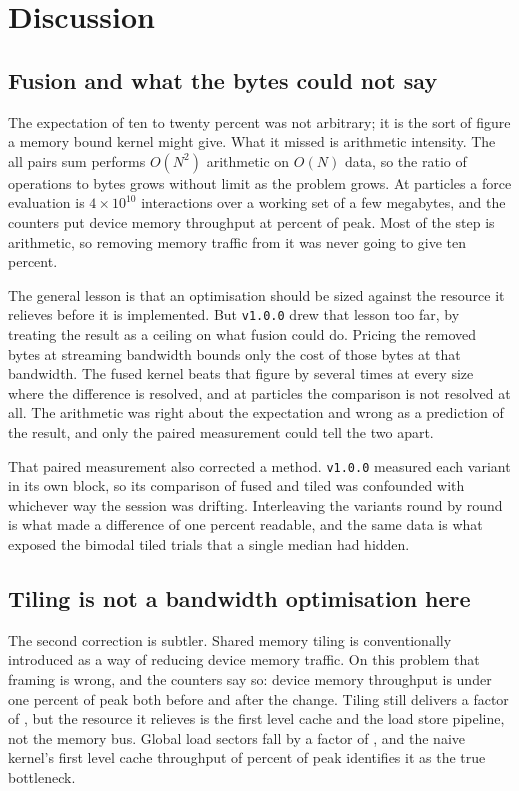 \chapter{Discussion}
\label{ch:discussion}

\section{Fusion and what the bytes could not say}

The expectation of ten to twenty percent was not arbitrary; it is the sort of figure a
memory bound kernel might give. What it missed is arithmetic intensity. The all pairs sum
performs $O(N^2)$ arithmetic on $O(N)$ data, so the ratio of operations to bytes grows
without limit as the problem grows. At \LadderMaxN{} particles a force evaluation is
$4 \times 10^{10}$ interactions over a working set of a few megabytes, and the counters
put device memory throughput at \TiledDramPct{} percent of peak. Most of the step is
arithmetic, so removing memory traffic from it was never going to give ten percent.

The general lesson is that an optimisation should be sized against the resource it relieves
before it is implemented. But \texttt{v1.0.0} drew that lesson too far, by treating the
result as a ceiling on what fusion could do. Pricing the removed bytes at streaming
bandwidth bounds only the cost of those bytes at that bandwidth. The fused kernel beats
that figure by several times at every size where the difference is resolved, and at
\LadderMaxN{} particles the comparison is not resolved at all. The arithmetic was right
about the expectation and wrong as a prediction of the result, and only the paired
measurement could tell the two apart.

That paired measurement also corrected a method. \texttt{v1.0.0} measured each variant in
its own block, so its comparison of fused and tiled was confounded with whichever way the
session was drifting. Interleaving the variants round by round is what made a difference of
one percent readable, and the same data is what exposed the bimodal tiled trials that a
single median had hidden.

\section{Tiling is not a bandwidth optimisation here}

The second correction is subtler. Shared memory tiling is conventionally
introduced as a way of reducing device memory traffic. On this problem that framing is
wrong, and the counters say so: device memory throughput is under one percent of peak both
before and after the change. Tiling still delivers a factor of
\TilingSpeedupAtMaxN{}, but the resource it relieves is the first level cache
and the load store pipeline, not the memory bus. Global load sectors fall by a
factor of \SectorReduction{}, and the naive kernel's first level cache
throughput of \NaiveLoneTexPct{} percent of peak identifies it as the true
bottleneck.

